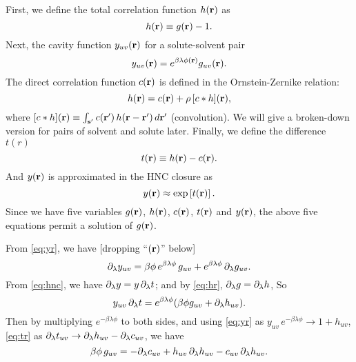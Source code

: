 \documentclass{article}
\begin{document}
First,
we define the total correlation function $h(\mathbf{r})$ as
\begin{equation}
  h(\mathbf{r}) \equiv g(\mathbf{r}) - 1.
  \label{eq:hr}
\end{equation}
%
%
%
Next, the cavity function $y_{uv}(\mathbf{r})$ for a solute-solvent pair
\begin{equation}
  y_{uv}(\mathbf{r}) = e^{ \beta \lambda \phi(\mathbf{r}) } g_{uv}(\mathbf{r}).
  \label{eq:yr}
\end{equation}
%
%
%
The direct correlation function $c(\mathbf{r})$
is defined in the Ornstein-Zernike relation:
\begin{equation}
  h(\mathbf{r}) = c(\mathbf{r}) + \rho \, [c * h](\mathbf{r}),
  \label{eq:cr}
\end{equation}
where $[c*h](\mathbf{r}) \equiv \int_{\mathbf{s}'} c(\mathbf{r}') \, h(\mathbf{r} - \mathbf{r}') \, d\mathbf{r}'$
  (convolution).
We will give a broken-down version for pairs of solvent and solute later.
%
%
%
Finally, we define the difference $t(r)$
\begin{equation}
  t(\mathbf{r}) \equiv h(\mathbf{r}) - c(\mathbf{r}).
  \label{eq:tr}
\end{equation}
%
%
%
And $y(\mathbf{r})$ is approximated in the HNC closure as
\begin{equation}
  y(\mathbf{r}) \approx \exp\left[ t(\mathbf{r}) \right].
  \label{eq:hnc}
\end{equation}
Since we have five variables
  $g(\mathbf{r})$, $h(\mathbf{r})$, $c(\mathbf{r})$, $t(\mathbf{r})$ and $y(\mathbf{r})$,
the above five equations permit a solution of $g(\mathbf{r})$.



From \eqref{eq:yr}, we have [dropping ``$(\mathbf{r})$'' below]
\[
  \partial_\lambda y_{uv}
  =
  \beta \phi \, e^{ \beta \lambda \phi } \, g_{uv}
    +
    e^{ \beta \lambda \phi } \, \partial_\lambda g_{uv}.
\]
From \eqref{eq:hnc}, we have $\partial_\lambda y = y \, \partial_\lambda t$;
and by \eqref{eq:hr}, $\partial_\lambda g = \partial_\lambda h$, So
\[
  y_{uv} \, \partial_\lambda t = e^{\beta \lambda \phi }
  ( \beta \phi g_{uv} + \partial_\lambda h_{uv} ).
\]
Then by multiplying $e^{-\beta \lambda \phi}$ to both sides,
and using
\eqref{eq:yr}
as $y_{uv} \, e^{-\beta \lambda \phi} \rightarrow 1 + h_{uv}$,
\eqref{eq:tr}
as $\partial_\lambda t_{uv} \rightarrow \partial_\lambda h_{uv} - \partial_\lambda c_{uv}$,
we have
\begin{equation}
  \beta \phi \, g_{uv}
  =
  - \partial_\lambda c_{uv} + h_{uv} \, \partial_\lambda h_{uv} - c_{uv} \, \partial_\lambda h_{uv}.
  \label{eq:hc1}
\end{equation}
\end{document}
